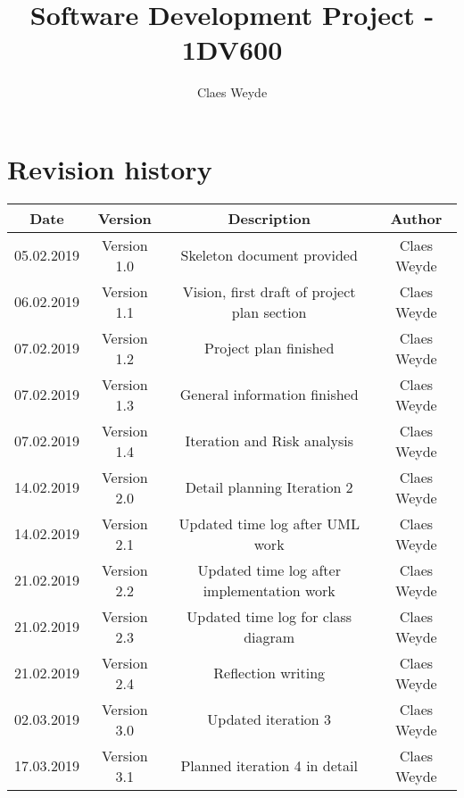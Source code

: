 \documentclass[12pt, letterpaper]{article}
\title{Software Development Project - 1DV600}
\author{Claes Weyde}
\begin{document}
\maketitle
\newpage
\tableofcontents{}
\newpage

\section{Revision history}
\begin{center}
	\begin{tabular}{|c|c|c|c|} 
		\hline
		Date & Version & Description & Author \\ [0.5ex] 
		\hline\hline
		05.02.2019 & Version 1.0 & Skeleton document provided & Claes Weyde \\
		\hline
		06.02.2019 & Version 1.1 & Vision, first draft of project plan section & 
		Claes Weyde \\
		\hline
		07.02.2019 & Version 1.2 & Project plan finished & Claes Weyde \\ [1ex] 
		\hline
		07.02.2019 & Version 1.3 & General information finished & Claes Weyde \\
		\hline
		07.02.2019 & Version 1.4 & Iteration and Risk analysis & Claes Weyde \\ 
		\hline
		14.02.2019 & Version 2.0 & Detail planning Iteration 2 & Claes Weyde \\
		\hline
		14.02.2019 & Version 2.1 & Updated time log after UML work & Claes Weyde \\
		\hline
		21.02.2019 & Version 2.2 & Updated time log after implementation work & Claes Weyde \\
		\hline
		21.02.2019 & Version 2.3 & Updated time log for class diagram & Claes Weyde \\
		\hline
		21.02.2019 & Version 2.4 & Reflection writing & Claes Weyde \\
		\hline
		02.03.2019 & Version 3.0 & Updated iteration 3 & Claes Weyde \\
		\hline
		17.03.2019 & Version 3.1 & Planned iteration 4 in detail & Claes Weyde \\
		[1ex]
		\hline
		
	\end{tabular}
\end{center}
\newpage
\end{document}
